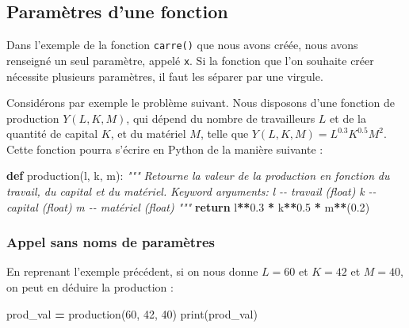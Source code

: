 \documentclass[
  12pt,
]{book}
\newenvironment{Shaded}{\begin{snugshade}}{\end{snugshade}}
\newcommand{\BuiltInTok}[1]{#1}
\newcommand{\CommentTok}[1]{\textcolor[rgb]{0.56,0.35,0.01}{\textit{#1}}}
\newcommand{\ControlFlowTok}[1]{\textcolor[rgb]{0.13,0.29,0.53}{\textbf{#1}}}
\newcommand{\DecValTok}[1]{\textcolor[rgb]{0.00,0.00,0.81}{#1}}
\newcommand{\FloatTok}[1]{\textcolor[rgb]{0.00,0.00,0.81}{#1}}
\newcommand{\KeywordTok}[1]{\textcolor[rgb]{0.13,0.29,0.53}{\textbf{#1}}}
\newcommand{\NormalTok}[1]{#1}
\newcommand{\OperatorTok}[1]{\textcolor[rgb]{0.81,0.36,0.00}{\textbf{#1}}}
\numberwithin{equation}{section}
\numberwithin{countremarque}{section}
\begin{document}
\subsection{Paramètres d'une fonction}\label{paramuxe8tres-dune-fonction}

Dans l'exemple de la fonction \texttt{carre()} que nous avons créée, nous avons renseigné un seul paramètre, appelé \texttt{x}. Si la fonction que l'on souhaite créer nécessite plusieurs paramètres, il faut les séparer par une virgule.

Considérons par exemple le problème suivant. Nous disposons d'une fonction de production \(Y(L, K, M)\), qui dépend du nombre de travailleurs \(L\) et de la quantité de capital \(K\), et du matériel \(M\), telle que \(Y(L, K, M) = L^{0.3} K^{0.5}M^2\). Cette fonction pourra s'écrire en Python de la manière suivante :

\begin{Shaded}
\begin{Highlighting}[]
\KeywordTok{def}\NormalTok{ production(l, k, m):}
  \CommentTok{"""}
\CommentTok{  Retourne la valeur de la production en fonction}
\CommentTok{  du travail, du capital et du matériel.}
\CommentTok{  }
\CommentTok{  Keyword arguments:}
\CommentTok{  l {-}{-} travail (float)}
\CommentTok{  k {-}{-} capital (float)}
\CommentTok{  m {-}{-} matériel (float)}
\CommentTok{  """}
  \ControlFlowTok{return}\NormalTok{ l}\OperatorTok{**}\FloatTok{0.3} \OperatorTok{*}\NormalTok{ k}\OperatorTok{**}\FloatTok{0.5} \OperatorTok{*}\NormalTok{ m}\OperatorTok{**}\NormalTok{(}\FloatTok{0.2}\NormalTok{)}
\end{Highlighting}
\end{Shaded}

\subsubsection{Appel sans noms de paramètres}\label{appel-sans-noms-de-paramuxe8tres}

En reprenant l'exemple précédent, si on nous donne \(L = 60\) et \(K = 42\) et \(M = 40\), on peut en déduire la production :

\begin{Shaded}
\begin{Highlighting}[]
\NormalTok{prod\_val }\OperatorTok{=}\NormalTok{ production(}\DecValTok{60}\NormalTok{, }\DecValTok{42}\NormalTok{, }\DecValTok{40}\NormalTok{)}
\BuiltInTok{print}\NormalTok{(prod\_val)}
\end{Highlighting}
\end{Shaded}
\end{document}
